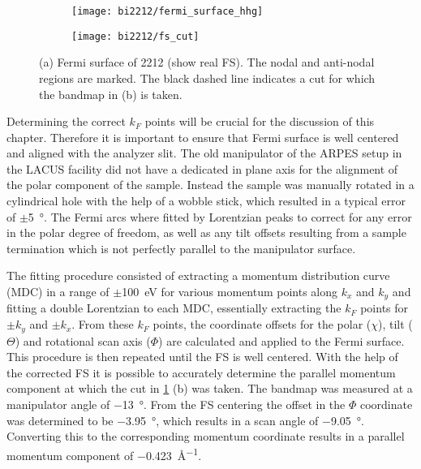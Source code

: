 \begin{figure}[t]
	\centering
	\begin{subfigure}[b]{0.49\textwidth}
		\texttt{[image: bi2212/fermi\_surface\_hhg]}
		\caption{}
	\end{subfigure}
	\begin{subfigure}[b]{0.45\textwidth}
		\texttt{[image: bi2212/fs\_cut]}
		\caption{}
	\end{subfigure}
	\caption{(a) Fermi surface of 2212 (show real FS). The nodal and anti-nodal regions are marked. The black dashed line indicates a cut for which the bandmap in (b) is taken.}
	\label{fig:fs_cut}
\end{figure}

Determining the correct $k_F$ points will be crucial for the discussion of this chapter.
Therefore it is important to ensure that Fermi surface is well centered and aligned with the analyzer slit.
The old manipulator of the ARPES setup in the LACUS facility did not have a dedicated in plane axis for the alignment of the polar component of the sample.
Instead the sample was manually rotated in a cylindrical hole with the help of a wobble stick, which resulted in a typical error of $\pm$\qty{5}{\degree}.
The Fermi arcs where fitted by Lorentzian peaks to correct for any error in the polar degree of freedom, as well as any tilt offsets resulting from a sample termination which is not perfectly parallel to the manipulator surface.

The fitting procedure consisted of extracting a momentum distribution curve (MDC) in a range of $\pm$\qty{100}{\electronvolt} for various momentum points along $k_x$ and $k_y$ and fitting a double Lorentzian to each MDC, essentially extracting the $k_F$ points for $\pm k_y$ and $\pm k_x$.
From these $k_F$ points, the coordinate offsets for the polar ($\chi$), tilt ($\Theta$) and rotational scan axis ($\Phi$) are calculated and applied to the Fermi surface.
This procedure is then repeated until the FS  is well centered.
With the help of the corrected FS it is possible to accurately determine the parallel momentum component at which the cut in \ref{fig:fs_cut} (b) was taken.
The bandmap was measured at a manipulator angle of \qty{-13}{\degree}.
From the FS centering the offset in the $\Phi$ coordinate was determined to be \qty{-3.95}{\degree}, which results in a scan angle of \qty{-9.05}{\degree}.
Converting this to the corresponding momentum coordinate results in a parallel momentum component of \qty{-0.423}{\angstrom^{-1}}.

